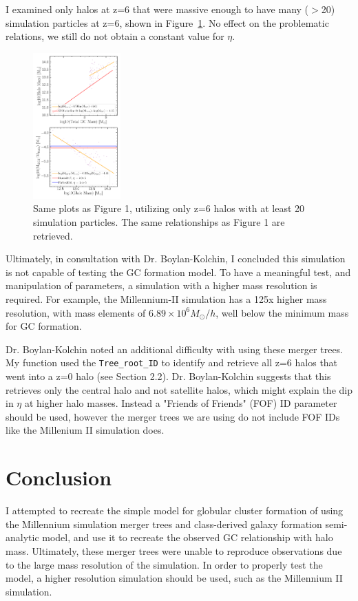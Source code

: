 \documentclass[onecolumn]{aastex62}
\begin{document}
I examined only halos at z=6 that were massive enough to have many ($>$20) simulation particles at z=6, shown in Figure~\ref{fig:20 part}.  No effect on the problematic relations, we still do not obtain a constant value for $\eta$.  

\begin{figure}[!htb]
\centering
\includegraphics[width=0.3\textwidth]{GCtest_only_20_particles.png}
\caption{\small{Same plots as Figure 1, utilizing only z=6 halos with at least 20 simulation particles.  The same relationships as Figure 1 are retrieved.}}
\label{fig:20 part}
\end{figure}


Ultimately, in consultation with Dr. Boylan-Kolchin, I concluded this simulation is not capable of testing the  GC formation model.  To have a meaningful test, and manipulation of parameters, a simulation with a higher mass resolution is required.  For example, the Millennium-II simulation \citep{Mill2} has a 125x higher mass resolution, with mass elements of $6.89\times10^6 M_\odot/h$, well below the minimum mass for GC formation.

Dr. Boylan-Kolchin noted an additional difficulty with using these merger trees.  My function used the \texttt{Tree\_root\_ID} to identify and retrieve all z=6 halos that went into a z=0 halo (see Section 2.2).  Dr. Boylan-Kolchin suggests that this retrieves only the central halo and not satellite halos, which might explain the dip in $\eta$ at higher halo masses.  Instead a "Friends of Friends" (FOF) ID parameter should be used, however the merger trees we are using do not include FOF IDs like the Millenium II simulation does.

\section{Conclusion}
I attempted to recreate the simple model for globular cluster formation of  using the Millennium simulation merger trees and class-derived galaxy formation semi-analytic model, and use it to recreate the observed GC relationship with halo mass.  Ultimately, these merger trees were unable to reproduce observations due to the large mass resolution of the simulation.  In order to properly test the model, a higher resolution simulation should be used, such as the Millennium II simulation.
\end{document}
